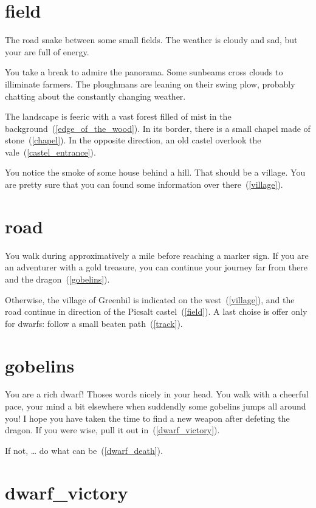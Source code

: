 
\section{field}

The road snake between some small fields. The weather is cloudy and sad, but
your are full of energy.

You take a break to admire the panorama. Some sunbeams cross clouds to
illiminate farmers. The ploughmans are leaning on their swing plow, probably
chatting about the constantly changing weather.

The landscape is feeric with a vast forest filled of mist in the
background~(\ref{edge_of_the_wood}). In its border, there is a small chapel made
of stone~(\ref{chapel}). In the opposite direction, an old castel overlook the
vale~(\ref{castel_entrance}).

You notice the smoke of some house behind a hill. That should be a village. You
are pretty sure that you can found some information over there~(\ref{village}).

\section{road}

You walk during approximatively a mile before reaching a marker sign. If you are
an adventurer with a gold treasure, you can continue your journey far from there and
the dragon~(\ref{gobelins}).

Otherwise, the village of Greenhil is indicated on the west~(\ref{village}), and
the road continue in direction of the Picsalt castel~(\ref{field}). A last
choise is offer only for dwarfs: follow a small beaten path~(\ref{track}).

\section{gobelins}

You are a rich dwarf! Thoses words nicely in your head. You walk with a cheerful
pace, your mind a bit elsewhere when suddendly some gobelins jumps all around
you! I hope you have taken the time to find a new weapon after defeting the dragon. If
you were wise, pull it out in~(\ref{dwarf_victory}).

If not, … do what can be~(\ref{dwarf_death}).

\section{dwarf_victory}

